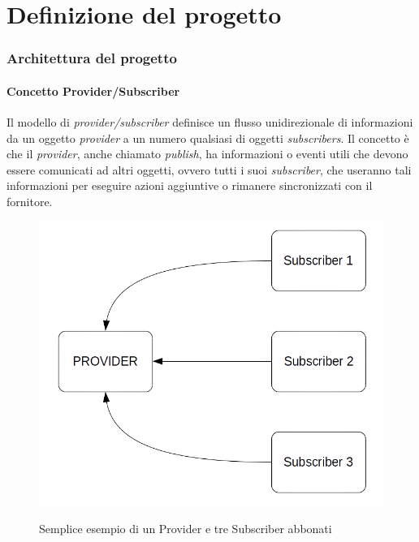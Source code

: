 \chapter{Definizione del progetto}
\setcounter{section}{1}
\item
\subsection{Architettura del progetto}
\subsubsection{Concetto Provider/Subscriber}
Il modello di \textit{provider/subscriber} definisce un flusso unidirezionale di informazioni da un oggetto \textit{provider} a un numero qualsiasi di oggetti \textit{subscribers}. Il concetto \`{e} che il \textit{provider}, anche chiamato \textit{publish}, ha informazioni o eventi utili che devono essere comunicati ad altri oggetti, ovvero tutti i suoi \textit{subscriber}, che useranno tali informazioni per eseguire azioni aggiuntive o rimanere sincronizzati con il fornitore. 

\begin{figure}[htbp]
\centering
\includegraphics[scale=0.55]{img/pubsub_1.png}\\
\caption{Semplice esempio di un Provider e tre Subscriber abbonati \label{figura1.14}}
\end{figure}

